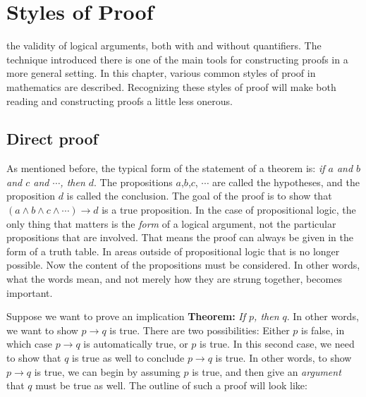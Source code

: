 \chapter{Styles of Proof}



 the validity of logical arguments, both with and without quantifiers.
The technique introduced there is one of the main tools for constructing proofs in a more
general setting.  In this chapter, various common styles of proof in mathematics are described. 
Recognizing these styles of proof will make both  reading  and constructing proofs a little less 
onerous.


\section{Direct proof}
As mentioned  before, the typical form of the statement of a theorem is: 
{\itshape if $a$ and $b$ and $c$ and $\cdots$,
then $d$}. The propositions $a$,$b$,$c$, $\cdots$ are called the hypotheses, and the
 proposition $d$ is called the
conclusion. The goal of the proof is to show that $(a\land b\land c\land \cdots)\to d$
is a true proposition. In the case of propositional logic, the only thing that matters is the 
{\itshape form} of a logical
argument, not the particular propositions that are involved. That means the proof can always
 be given in 
the form of a truth table.
In areas outside of propositional logic that is no longer possible. Now the content of the propositions
must be considered. In other words, what the words mean, and not merely how they are strung
 together, becomes
important.

Suppose we want to prove an implication {\bfseries Theorem:} {\itshape If $p$, then $q$}. 
In other words,
we want to show $p\to q$ is true.
There are two possibilities: Either $p$ is false, in which case $p\to q$ is automatically
true, or $p$ is true. In this second case, we need to show that $q$ is true as well to 
conclude $p\to q$ is true.  In other words, to show $p\to q$ is true, we can
begin by assuming $p$ is true, and then give an {\itshape argument} that
$q$ must be true as well.
The outline of such a proof will look like:

\medskip
{}
\medskip



